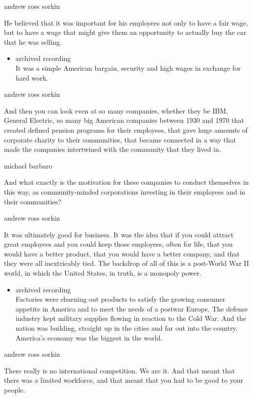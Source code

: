 andrew ross sorkin

He believed that it was important for his employees not only to have a
fair wage, but to have a wage that might give them an opportunity to
actually buy the car that he was selling.

\begin{itemize}
\tightlist
\item
  archived recording\\
  It was a simple American bargain, security and high wages in exchange
  for hard work.
\end{itemize}

andrew ross sorkin

And then you can look even at so many companies, whether they be IBM,
General Electric, so many big American companies between 1930 and 1970
that created defined pension programs for their employees, that gave
huge amounts of corporate charity to their communities, that became
connected in a way that made the companies intertwined with the
community that they lived in.

michael barbaro

And what exactly is the motivation for these companies to conduct
themselves in this way, as community-minded corporations investing in
their employees and in their communities?

andrew ross sorkin

It was ultimately good for business. It was the idea that if you could
attract great employees and you could keep those employees, often for
life, that you would have a better product, that you would have a better
company, and that they were all inextricably tied. The backdrop of all
of this is a post-World War II world, in which the United States, in
truth, is a monopoly power.

\begin{itemize}
\tightlist
\item
  archived recording\\
  Factories were churning out products to satisfy the growing consumer
  appetite in America and to meet the needs of a postwar Europe. The
  defense industry kept military supplies flowing in reaction to the
  Cold War. And the nation was building, straight up in the cities and
  far out into the country. America's economy was the biggest in the
  world.
\end{itemize}

andrew ross sorkin

There really is no international competition. We are it. And that meant
that there was a limited workforce, and that meant that you had to be
good to your people.

